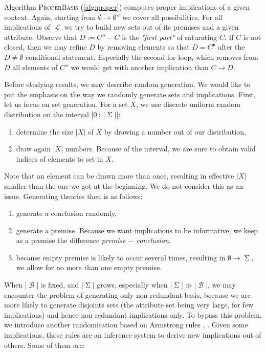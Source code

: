 \documentclass[runningheads]{llncs}
\DeclareMathOperator{\I}{\mathcal{L}}  %
\DeclareMathOperator{\Sg}{\Sigma}  %
\DeclareMathOperator{\imp}{\longrightarrow} %
\DeclareMathOperator{\B}{\mathcal{B}}
\begin{document}
Algorithm \textsc{ProperBasis} (\ref{alg:proper}) computes proper implications of a given context. Again, starting from $\emptyset \imp \emptyset''$ we cover all possibilities. For all implications of $\I$ we try to build new sets out of
its premises and a given attribute. Observe that $D := C'' - C$ is the \textit{"first part"} of saturating $C$. If $C$ is not closed, then we may refine $D$ by removing elements so that $D = C^{\bullet}$ after the $D \neq \emptyset$ conditional statement. Especially the second for loop, which removes
from $D$ all elements of $C''$ we would get with another implication than $C \imp D$.

Before studying results, we may describe random generation.
We would like to put the emphasis on the way we randomly generate sets and 
implications. First, let us focus on set generation. For a set $X$, we use discrete uniform random distribution on the interval 
$\lbrack 0 \ ; \ |\Sg| \rbrack$:
\begin{enumerate}
	\item determine the size $|X|$ of $X$ by drawing a number out of our 
	distribution,
	\item draw again $|X|$ numbers. Because of the interval, we are sure to
	obtain valid indices of elements to set in $X$.
\end{enumerate}
\noindent Note that an element can be drawn more than once, resulting in 
effective $|X|$ smaller than the one we got at the beginning. We do not consider
this as an issue. Generating theories then is as follows:
\begin{enumerate}
	\item generate a conclusion randomly,
	\item generate a premise. Because we want implications to be informative,
	we keep as a premise the difference \textit{premise $-$ conclusion}.
	\item because empty premise is likely to occur several times, resulting in
	$\emptyset \imp \Sg$, we allow for no more than one empty premise. 
\end{enumerate}
When $|\B|$ is fixed, and $|\Sg|$ grows, especially when $|\Sg| \gg |\B|$, we may encounter the problem of generating only non-redundant basis, because we are more likely to generate disjoints sets (the attribute set being very large, for few implications) and hence non-redundant implications only. To bypass this problem, we introduce another randomisation based on Armstrong rules \cite{armstrong_dependency_1974}, \cite{ganter_conceptual_2016}. Given some implications, those rules are an inference system to derive new implications out of others. Some of them are:
\end{document}
